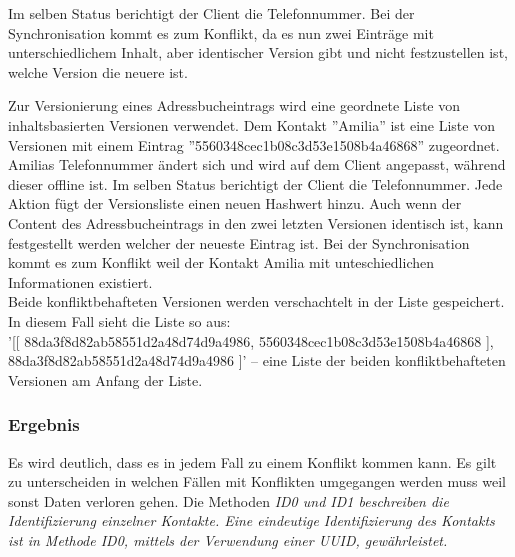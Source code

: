\begin{description}[leftmargin=0.5cm,style=nextline]
    Im selben Status berichtigt der Client die Telefonnummer. Bei der Synchronisation kommt es zum Konflikt, da es nun zwei Einträge mit unterschiedlichem Inhalt, aber identischer Version gibt und nicht festzustellen ist, welche Version die neuere ist.\\
  \item[Methode V4 -- Liste von inhaltsbasierten Versionen:]
    Zur Versionierung eines Adressbucheintrags wird eine geordnete Liste von inhaltsbasierten Versionen verwendet.
    Dem Kontakt ''Amilia'' ist eine Liste von Versionen mit einem Eintrag ''5560348cec1b08c3d53e1508b4a46868'' zugeordnet.
    Amilias Telefonnummer ändert sich und wird auf dem Client angepasst, während dieser offline ist. Im selben Status berichtigt der Client die Telefonnummer.
    Jede Aktion fügt der Versionsliste einen neuen Hashwert hinzu.
    Auch wenn der Content des Adressbucheintrags in den zwei letzten Versionen identisch ist, kann festgestellt werden welcher der neueste Eintrag ist.
    Bei der Synchronisation kommt es zum Konflikt weil der Kontakt Amilia mit unteschiedlichen Informationen existiert.\\
    Beide konfliktbehafteten Versionen werden verschachtelt in der Liste gespeichert.
    In diesem Fall sieht die Liste so aus: \\
    '[[ 88da3f8d82ab58551d2a48d74d9a4986, 5560348cec1b08c3d53e1508b4a46868 ], 88da3f8d82ab58551d2a48d74d9a4986 ]' -- eine Liste der beiden konfliktbehafteten Versionen am Anfang der Liste.
\end{description}
%
%
\subsubsection*{Ergebnis}
Es wird deutlich, dass es in jedem Fall zu einem Konflikt kommen kann. Es gilt zu unterscheiden in welchen Fällen mit Konflikten umgegangen werden muss weil sonst Daten verloren gehen.
Die Methoden \it{ID0} und \it{ID1} beschreiben die Identifizierung einzelner Kontakte.
Eine eindeutige Identifizierung des Kontakts ist in Methode \it{ID0}, mittels der Verwendung einer \gls{UUID}, gewährleistet.